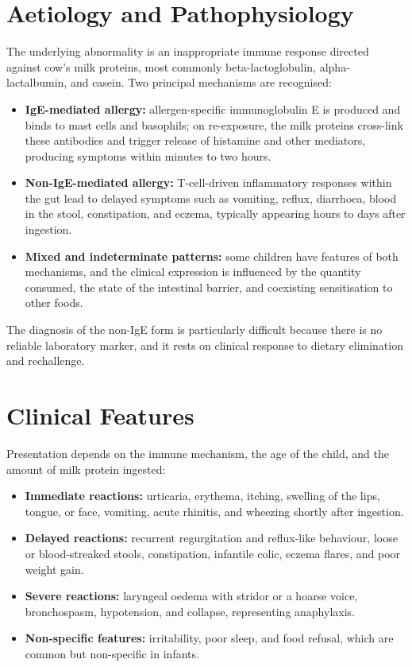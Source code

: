 \section*{Aetiology and Pathophysiology}
The underlying abnormality is an inappropriate immune response directed against cow's milk proteins, most commonly beta-lactoglobulin, alpha-lactalbumin, and casein. Two principal mechanisms are recognised:

\begin{itemize}
    \item \textbf{IgE-mediated allergy:} allergen-specific immunoglobulin E is produced and binds to mast cells and basophils; on re-exposure, the milk proteins cross-link these antibodies and trigger release of histamine and other mediators, producing symptoms within minutes to two hours.
    \item \textbf{Non-IgE-mediated allergy:} T-cell-driven inflammatory responses within the gut lead to delayed symptoms such as vomiting, reflux, diarrhoea, blood in the stool, constipation, and eczema, typically appearing hours to days after ingestion.
    \item \textbf{Mixed and indeterminate patterns:} some children have features of both mechanisms, and the clinical expression is influenced by the quantity consumed, the state of the intestinal barrier, and coexisting sensitisation to other foods.
\end{itemize}

The diagnosis of the non-IgE form is particularly difficult because there is no reliable laboratory marker, and it rests on clinical response to dietary elimination and rechallenge.

\section*{Clinical Features}
Presentation depends on the immune mechanism, the age of the child, and the amount of milk protein ingested:

\begin{itemize}
    \item \textbf{Immediate reactions:} urticaria, erythema, itching, swelling of the lips, tongue, or face, vomiting, acute rhinitis, and wheezing shortly after ingestion.
    \item \textbf{Delayed reactions:} recurrent regurgitation and reflux-like behaviour, loose or blood-streaked stools, constipation, infantile colic, eczema flares, and poor weight gain.
    \item \textbf{Severe reactions:} laryngeal oedema with stridor or a hoarse voice, bronchospasm, hypotension, and collapse, representing anaphylaxis.
    \item \textbf{Non-specific features:} irritability, poor sleep, and food refusal, which are common but non-specific in infants.
\end{itemize}

